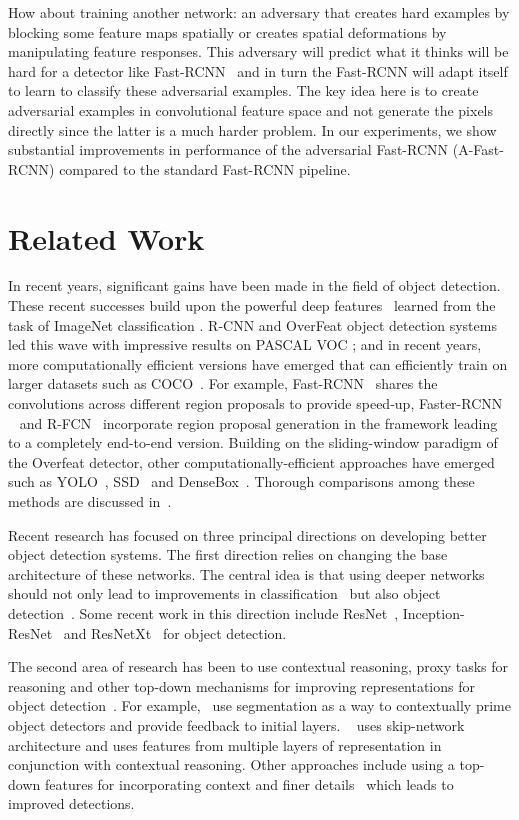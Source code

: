 \documentclass[10pt,twocolumn,letterpaper]{article}
\begin{document}
How about training another network: an adversary that creates hard examples by blocking some feature maps spatially or creates spatial deformations by manipulating feature responses. This adversary will predict what it thinks will be hard for a detector like Fast-RCNN~\cite{frcn} and in turn the Fast-RCNN will adapt itself to learn to classify these adversarial examples. The key idea here is to create adversarial examples in convolutional feature space and not generate the pixels directly since the latter is a much harder problem. In our experiments, we show substantial improvements in performance of the adversarial Fast-RCNN (A-Fast-RCNN) compared to the standard Fast-RCNN pipeline.

\section{Related Work}
In recent years, significant gains have been made in the field of object detection. These recent successes build upon the powerful deep features~\cite{alex} learned from the task of ImageNet classification \cite{imagenet}. R-CNN \cite{rcnn} and OverFeat \cite{overfeat} object detection systems led this wave with impressive results on PASCAL VOC \cite{voc}; and in recent years, more computationally efficient versions have emerged that can efficiently train on larger datasets such as COCO~\cite{coco}. For example, Fast-RCNN~\cite{frcn} shares the convolutions across different region proposals to provide speed-up, Faster-RCNN ~\cite{renNIPS15fasterrcnn} and R-FCN~\cite{dai16rfcn} incorporate region proposal generation in the framework leading to a completely end-to-end version. Building on the sliding-window paradigm of the Overfeat detector, other computationally-efficient approaches have emerged such as YOLO~\cite{yolo16}, SSD~\cite{ssd16} and DenseBox~\cite{densebox}. Thorough comparisons among these methods are discussed in~\cite{Jonathan16}. 


Recent research has focused on three principal directions on developing better object detection systems.
The first direction relies on changing the base architecture of these networks. The central idea is that using deeper networks should not only lead to improvements in classification~\cite{imagenet} but also object detection~\cite{voc,coco}. Some recent work in this direction include ResNet~\cite{resnet},  Inception-ResNet~\cite{inceptionresnet} and ResNetXt~\cite{Xie2016} for object detection.

The second area of research has been to use contextual reasoning, proxy tasks for reasoning and other top-down mechanisms for improving representations for object detection~\cite{ion,DeepMask,TDM17,FPN17,shrivastava16,Gidaris15,Zengeccv16}. For example,~\cite{shrivastava16} use segmentation as a way to contextually prime object detectors and provide feedback to initial layers. ~\cite{ion} uses skip-network architecture and uses features from multiple layers of representation in conjunction with contextual reasoning. Other approaches include using a top-down features for incorporating context and finer details~\cite{DeepMask,TDM17,FPN17} which leads to improved detections.
\end{document}
